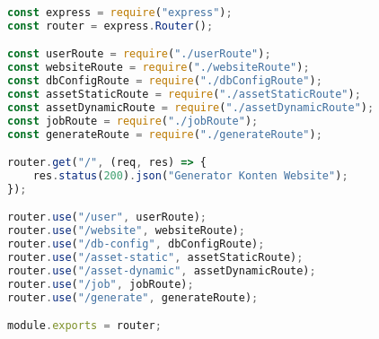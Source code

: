 \begin{lstlisting}[language=Javascript,caption={Index Route}]
const express = require("express");
const router = express.Router();

const userRoute = require("./userRoute");
const websiteRoute = require("./websiteRoute");
const dbConfigRoute = require("./dbConfigRoute");
const assetStaticRoute = require("./assetStaticRoute");
const assetDynamicRoute = require("./assetDynamicRoute");
const jobRoute = require("./jobRoute");
const generateRoute = require("./generateRoute");

router.get("/", (req, res) => {
	res.status(200).json("Generator Konten Website");
});

router.use("/user", userRoute);
router.use("/website", websiteRoute);
router.use("/db-config", dbConfigRoute);
router.use("/asset-static", assetStaticRoute);
router.use("/asset-dynamic", assetDynamicRoute);
router.use("/job", jobRoute);
router.use("/generate", generateRoute);

module.exports = router;
\end{lstlisting}